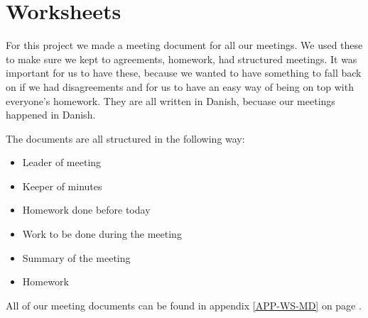 \chapter{Worksheets}
For this project we made a meeting document for all our meetings. We used
these to make sure we kept to agreements, homework, had structured meetings. It
was important for us to have these, because we wanted to have something to fall
back on if we had disagreements and for us to have an easy way of being on top
with everyone's homework. They are all written in Danish, becuase our meetings
happened in Danish.

The documents are all structured in the following way: 
\begin{itemize}
  \item Leader of meeting
  \item Keeper of minutes
  \item Homework done before today
  \item Work to be done during the meeting
  \item Summary of the meeting
  \item Homework
\end{itemize}

All of our meeting documents can be found in appendix \ref{APP-WS-MD} on page
\pageref{APP-WS-MD}.

